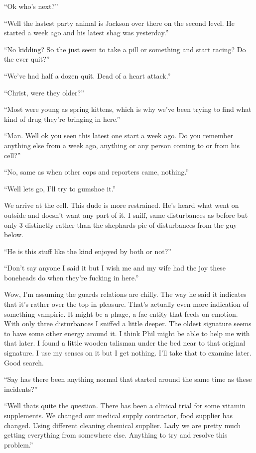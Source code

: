 ``Ok who's next?''

``Well the lastest party animal is Jackson over there on the second level. He started a week ago and his latest shag was yesterday.''

``No kidding? So the just seem to take a pill or something and start racing? Do the ever quit?''

``We've had half a dozen quit. Dead of a heart attack.''

``Christ, were they older?''

``Most were young as spring kittens, which is why we've been trying to find what kind of drug they're bringing in here.''

``Man. Well ok you seen this latest one start a week ago. Do you remember anything else from a week ago, anything or any person coming to or from his cell?''

``No, same as when other cops and reporters came, nothing.''

``Well lets go, I'll try to gumshoe it.''

We arrive at the cell. This dude is more restrained. He's heard what went on outside and doesn't want any part of it. I sniff, same disturbances as before but only 3 distinctly rather than the shephards pie of disturbances from the guy below.

``He is this stuff like the kind enjoyed by both or not?''

``Don't say anyone I said it but I wish me and my wife had the joy these boneheads do when they're fucking in here.''

Wow, I'm assuming the guards relations are chilly. The way he said it indicates that it's rather over the top in pleasure. That's actually even more indication of something vampiric. It might be a phage, a fae entity that feeds on emotion. With only three disturbances I sniffed a little deeper. The oldest signature seems to have some other energy around it. I think Phil might be able to help me with that later. I found a little wooden talisman under the bed near to that original signature. I use my senses on it but I get nothing. I'll take that to examine later. Good search.

``Say has there been anything normal that started around the same time as these incidents?''

``Well thats quite the question. There has been a clinical trial for some vitamin supplements. We changed our medical supply contractor, food supplier has changed. Using different cleaning chemical supplier. Lady we are pretty much getting everything from somewhere else. Anything to try and resolve this problem.''

